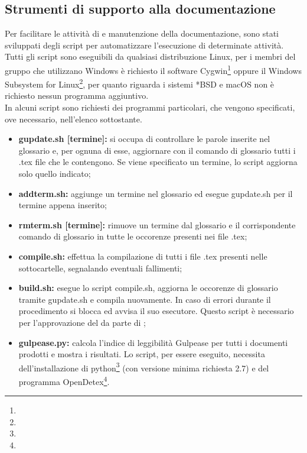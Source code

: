 \documentclass[NormeDiProgetto.tex]{subfiles}
\begin{document}
	\subsection{Strumenti di supporto alla documentazione}
	Per facilitare le attività di  e manutenzione della documentazione, sono stati sviluppati degli script per automatizzare l'esecuzione di determinate attività. \\
	Tutti gli script sono eseguibili da qualsiasi distribuzione Linux, per i membri del gruppo che utilizzano Windows è richiesto il software Cygwin\footnote{} oppure il Windows Subsystem for Linux\footnote{}, per quanto riguarda i sistemi *BSD e macOS non è richiesto nessun programma aggiuntivo.\\
	In alcuni script sono richiesti dei programmi particolari, che vengono specificati, ove necessario, nell'elenco sottostante.
	\begin{itemize}
		\item \textbf{gupdate.sh [termine]:} si occupa di controllare le parole inserite nel glossario e, per ognuna di esse, aggiornare con il comando di glossario tutti i .tex file che le contengono. Se viene specificato un termine, lo script aggiorna solo quello indicato;
		\item \textbf{addterm.sh:} aggiunge un termine nel glossario ed esegue gupdate.sh per il termine appena inserito;
		\item \textbf{rmterm.sh [termine]:} rimuove un termine dal glossario e il corrispondente comando di glossario in tutte le occorenze presenti nei file .tex;
		\item \textbf{compile.sh:} effettua la compilazione di tutti i file .tex presenti nelle sottocartelle, segnalando eventuali fallimenti;
		\item \textbf{build.sh:} esegue lo script compile.sh, aggiorna le occorenze di glossario tramite gupdate.sh e compila nuovamente. In caso di errori durante il procedimento si blocca ed avvisa il suo esecutore. Questo script è necessario per l'approvazione del  da parte di ;
		\item \textbf{gulpease.py:} calcola l'indice di leggibilità Gulpease per tutti i documenti prodotti e mostra i risultati. Lo script, per essere eseguito, necessita dell'installazione di python\footnote{} (con versione minima richiesta 2.7) e del programma OpenDetex\footnote{}.	
	\end{itemize}
	
\end{document}
